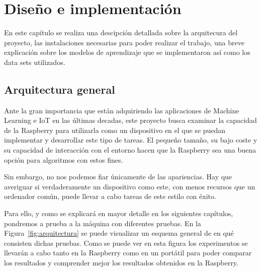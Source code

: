 \documentclass[a4paper, 12pt]{book}
\begin{document}
\chapter{Diseño e implementación}
\label{chap:diseño}

En este capítulo se realiza una descipción detallada sobre la arquitecura del proyecto, las instalaciones necesarias para poder realizar el trabajo, una breve explicación sobre los modelos de aprendizaje que se implementaron así como los data sets utilizados.

\section{Arquitectura general} 
\label{sec:arquitectura}

Ante la gran importancia que están adquiriendo las aplicaciones de Machine Learning e IoT en las últimas decadas, este proyecto busca examinar la capacidad de la Raspberry para utilizarla como un dispositivo en el que se puedan implementar y desarrollar este tipo de tareas. El pequeño tamaño, su bajo coste y su capacidad de interacción con el entorno hacen que la Raspberry sea una buena opción para algoritmos con estos fines. 

Sin embargo, no nos podemos fiar únicamente de las apariencias. Hay que averiguar si verdaderamente un dispositivo como este, con menos recursos que un ordenador común, puede llevar a cabo tareas de este estilo con éxito.

Para ello, y como se explicará en mayor detalle en los siguientes capítulos, pondremos a prueba a la máquina con diferentes pruebas. En la Figura~\ref{fig:arquitectura} se puede visualizar un esquema general de en qué consisten dichas pruebas. Como se puede ver en esta figura los experimentos se llevarán a cabo tanto en la Raspberry como en un portátil para poder comparar los resultados y comprender mejor los resultados obtenidos en la Raspberry.
\end{document}
